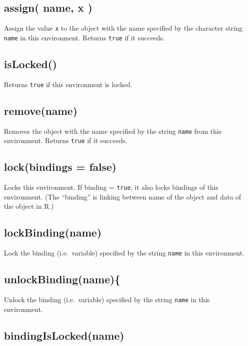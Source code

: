 \documentclass[]{book}
\theoremstyle{definition}
\theoremstyle{definition}
\theoremstyle{remark}
\begin{document}
\subsection{assign( name, x )}\label{assign-name-x}

Assign the value \texttt{x} to the object with the name specified by the
character string \texttt{name} in this environment. Returns
\texttt{true} if it succeeds.

\subsection{isLocked()}\label{islocked}

Returns \texttt{true} if this environment is locked.

\subsection{remove(name)}\label{removename}

Removes the object with the name specified by the string \texttt{name}
from this environment. Returns \texttt{true} if it succeeds.

\subsection{lock(bindings = false)}\label{lockbindings-false}

Locks this environment. If binding = \texttt{true}, it also locks
bindings of this environment. (The ``binding'' is linking between name
of the object and data of the object in R.)

\subsection{lockBinding(name)}\label{lockbindingname}

Lock the binding (i.e.~variable) specified by the string \texttt{name}
in this environment.

\subsection{unlockBinding(name)\{}\label{unlockbindingname}

Unlock the binding (i.e.~variable) specified by the string \texttt{name}
in this environment.

\subsection{bindingIsLocked(name)}\label{bindingislockedname}
\end{document}
